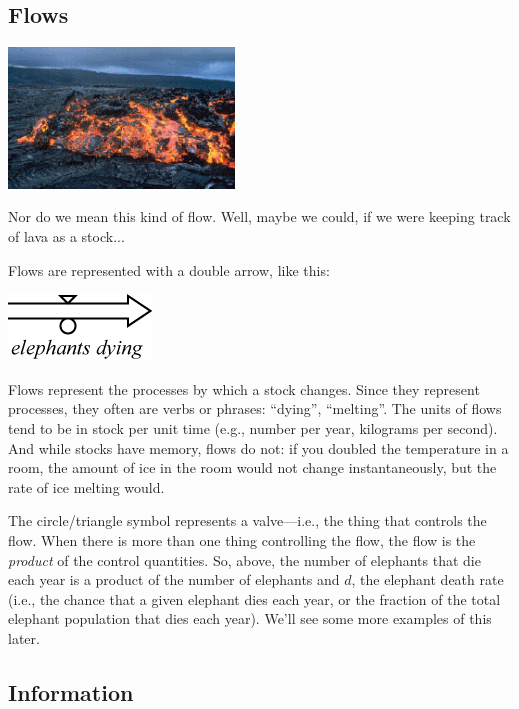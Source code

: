 \subsection{Flows}

\begin{marginfigure}
\includegraphics[width=6cm]{figs/lavaflow}
\caption{Nor do we mean this kind of flow. Well, maybe we could, if we were keeping track of lava as a stock...}
\end{marginfigure}
Flows are represented with a double arrow, like this:

\beforefig
\centerline{\includegraphics[height=.4in]{figs/Flow}}
\afterfig


Flows represent the processes by which a stock changes.  Since they represent processes, they often are verbs or phrases:  ``dying'', ``melting''.  The units of flows tend to be in stock per unit time (e.g., number per year, kilograms per second).  And while stocks have memory, flows do not: if you doubled the temperature 
in a room, the amount of ice in the room would not change instantaneously, but the rate of ice melting would.  

The circle/triangle symbol represents a valve---i.e., the thing that controls the flow.  When there is more than one thing controlling the flow, the flow is the {\em product} of the control quantities.  So, above, the number of elephants that die each year is a product of the number of elephants and $d$, the elephant death rate (i.e., the chance that a given elephant dies each year, or the fraction of the total elephant population that dies each year).  We'll see some more examples of this later.


\subsection{Information}

